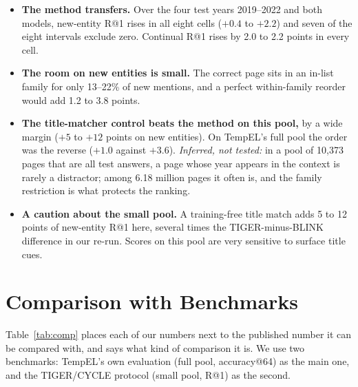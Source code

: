 \documentclass[conference]{IEEEtran}
\begin{document}
\begin{itemize}
\item \textbf{The method transfers.} Over the four test years 2019--2022 and both models, new-entity
R@1 rises in all eight cells ($+0.4$ to $+2.2$) and seven of the eight intervals exclude zero.
Continual R@1 rises by 2.0 to 2.2 points in every cell.
\item \textbf{The room on new entities is small.} The correct page sits in an in-list family for only
13--22\% of new mentions, and a perfect within-family reorder would add 1.2 to 3.8 points.
\item \textbf{The title-matcher control beats the method on this pool,} by a wide margin ($+5$ to
$+12$ points on new entities). On TempEL's full pool the order was the reverse ($+1.0$ against
$+3.6$). \emph{Inferred, not tested:} in a pool of 10,373 pages that are all test answers, a page
whose year appears in the context is rarely a distractor; among 6.18 million pages it often is, and
the family restriction is what protects the ranking.
\item \textbf{A caution about the small pool.} A training-free title match adds 5 to 12 points of
new-entity R@1 here, several times the TIGER-minus-BLINK difference in our re-run. Scores on this
pool are very sensitive to surface title cues.
\end{itemize}

\section{Comparison with Benchmarks}

Table~\ref{tab:comp} places each of our numbers next to the published number it can be compared with,
and says what kind of comparison it is. We use two benchmarks: TempEL's own evaluation (full pool,
accuracy@64) as the main one, and the TIGER/CYCLE protocol (small pool, R@1) as the second.
\end{document}
